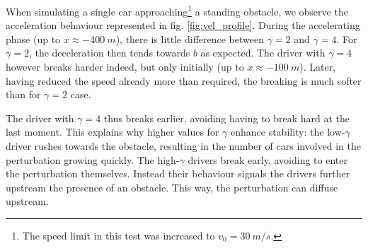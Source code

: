 When simulating a single car approaching\footnote{The speed limit in this test was increased to $v_0 = \SI{30}{m/s}$.} a standing obstacle, we observe the acceleration behaviour represented in fig. \ref{fig:vel_profile}. During the accelerating phase (up to $x\approx\SI{-400}{m}$), there is little difference between $\gamma=2$ and $\gamma=4$. For $\gamma = 2$, the deceleration then tends towards $b$ as expected. The driver with $\gamma=4$ however breaks harder indeed, but only initially (up to $x\approx \SI{-100}{m}$). Later, having reduced the speed already more than required, the breaking is much softer than for $\gamma=2$ case.

The driver with $\gamma=4$ thus breaks earlier, avoiding having to break hard at the last moment. This explains why higher values for $\gamma$ enhance stability: the low-$\gamma$ driver rushes towards the obstacle, resulting in the number of cars involved in the perturbation growing quickly. The high-$\gamma$ drivers break early, avoiding to enter the perturbation themselves. Instead their behaviour signals the drivers further upstream the presence of an obstacle. This way, the perturbation can diffuse upstream.

